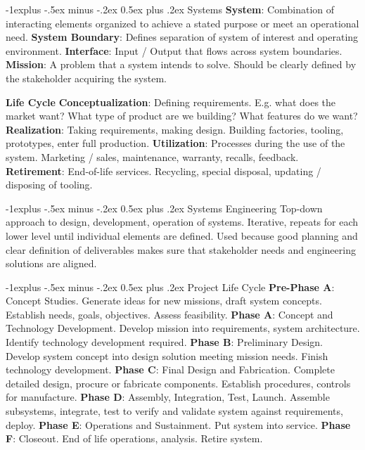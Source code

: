 \documentclass[letterpaper, 8pt]{extarticle}
\makeatletter
\renewcommand{\section}{\@startsection{section}{1}{0mm}%
                                {-1explus -.5ex minus -.2ex}%
                                {0.5ex plus .2ex}%
                                {\normalfont\normalsize\bfseries}}
\renewcommand{\subsection}{\@startsection{subsection}{2}{0mm}%
                                {-1explus -.5ex minus -.2ex}%
                                {0.5ex plus .2ex}%
                                {\normalfont\small\bfseries}}
\makeatother
\begin{document}
\begin{multicols*}{4}
\section{Systems}
\textbf{System}:
Combination of interacting elements organized
to achieve a stated purpose or meet an operational need.
\textbf{System Boundary}:
Defines separation of system of interest and operating environment.
\textbf{Interface}:
Input / Output that flows across system boundaries.
\textbf{Mission}:
A problem that a system intends to solve.
Should be clearly defined by the stakeholder acquiring the system.

\textbf{Life Cycle}
\textbf{Conceptualization}:
Defining requirements.
E.g. what does the market want?
What type of product are we building?
What features do we want?
\textbf{Realization}:
Taking requirements, making design.
Building factories, tooling, prototypes, enter full production.
\textbf{Utilization}:
Processes during the use of the system.
Marketing / sales, maintenance, warranty, recalls, feedback.
\textbf{Retirement}:
End-of-life services.
Recycling, special disposal, updating / disposing of tooling.

\subsection{Systems Engineering}
Top-down approach to design, development, operation of systems.
Iterative, repeats for each lower level until individual elements are defined.
Used because good planning and clear definition of deliverables makes sure that
stakeholder needs and engineering solutions are aligned.

\subsection{Project Life Cycle}
\textbf{Pre-Phase A}:
Concept Studies.
Generate ideas for new missions, draft system concepts.
Establish needs, goals, objectives. Assess feasibility.
\textbf{Phase A}:
Concept and Technology Development.
Develop mission into requirements, system architecture.
Identify technology development required.
\textbf{Phase B}:
Preliminary Design.
Develop system concept into design solution meeting mission needs.
Finish technology development.
\textbf{Phase C}:
Final Design and Fabrication.
Complete detailed design, procure or fabricate components.
Establish procedures, controls for manufacture.
\textbf{Phase D}:
Assembly, Integration, Test, Launch.
Assemble subsystems, integrate,
test to verify and validate system against requirements, deploy.
\textbf{Phase E}:
Operations and Sustainment.
Put system into service.
\textbf{Phase F}:
Closeout.
End of life operations, analysis. Retire system.


\end{multicols*}
\end{document}
